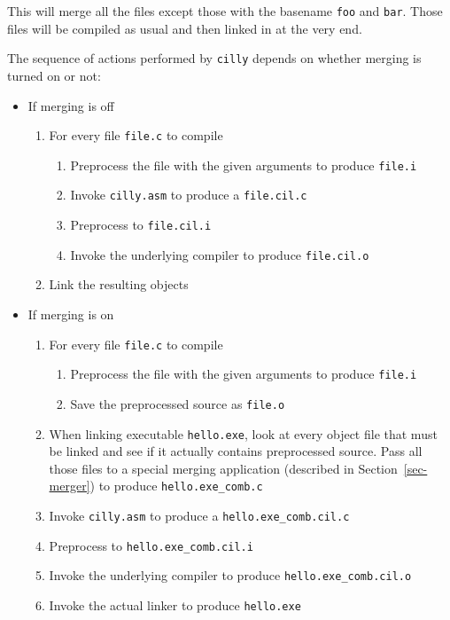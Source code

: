 \documentclass{article}
\def\secref#1{Section~\ref{sec-#1}}
\def\t#1{{\tt #1}}
\begin{document}
 This will merge all the files except those with the basename \t{foo} and
\t{bar}. Those files will be compiled as usual and then linked in at the very
end. 

 The sequence of actions performed by \t{cilly} depends on whether merging
is turned on or not:
\begin{itemize}
\item If merging is off
  \begin{enumerate}
    \item For every file \t{file.c} to compile
         \begin{enumerate}
            \item Preprocess the file with the given arguments to 
                  produce \t{file.i}
            \item Invoke \t{cilly.asm} to produce a \t{file.cil.c}
            \item Preprocess to \t{file.cil.i}
            \item Invoke the underlying compiler to produce \t{file.cil.o}
         \end{enumerate}
    \item Link the resulting objects
  \end{enumerate}
\item If merging is on
  \begin{enumerate}
    \item For every file \t{file.c} to compile
         \begin{enumerate}
            \item Preprocess the file with the given arguments to 
                  produce \t{file.i}
            \item Save the preprocessed source as \t{file.o}
         \end{enumerate}
    \item When linking executable \t{hello.exe}, look at every object 
          file that must be linked and see if it actually 
          contains preprocessed source. Pass all those files to a 
          special merging application (described in
          \secref{merger}) to produce \t{hello.exe\_comb.c}
    \item Invoke \t{cilly.asm} to produce a \t{hello.exe\_comb.cil.c}
    \item Preprocess to \t{hello.exe\_comb.cil.i}
    \item Invoke the underlying compiler to produce \t{hello.exe\_comb.cil.o}
    \item Invoke the actual linker to produce \t{hello.exe}
  \end{enumerate}
\end{itemize}
\end{document}
